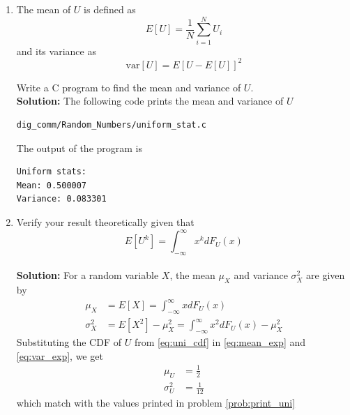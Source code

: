\documentclass[journal,10pt,twocolumn]{IEEEtran}
\providecommand{\sbrak}[1]{\ensuremath{{}\left[#1\right]}}
\newcommand{\solution}{\noindent \textbf{Solution: }}
\begin{document}
\begin{enumerate}
\item
\label{prob:print_uni}
The mean of $U$ is defined as
%
\begin{equation}
E\sbrak{U} = \frac{1}{N}\sum_{i=1}^{N}U_i
\end{equation}
%
and its variance as
%
\begin{equation}
\text{var}\sbrak{U} = E\sbrak{U- E\sbrak{U}}^2 
\end{equation}

Write a C program to  find the mean and variance of $U$.\\
\solution The following code prints the mean and variance of $U$
\begin{lstlisting}
dig_comm/Random_Numbers/uniform_stat.c
\end{lstlisting}
The output of the program is
\begin{lstlisting}
Uniform stats:
Mean: 0.500007
Variance: 0.083301
\end{lstlisting}

\item Verify your result theoretically given that
%
\begin{equation}
E\sbrak{U^k} = \int_{-\infty}^{\infty}x^kdF_{U}(x)
\end{equation}\\
\solution For a random variable $X$, the mean $\mu_X$ and variance $\sigma_X^2$ are given by
\begin{align}
	\label{eq:mean_exp}
	\mu_X &= E\sbrak{X} = \int_{-\infty}^{\infty}xdF_{U}(x) \\
	\label{eq:var_exp}
	\sigma_X^2 &= E\sbrak{X^2} - \mu_X^2 = \int_{-\infty}^{\infty}x^2dF_{U}(x) - \mu_X^2
\end{align}  
Substituting the CDF of $U$ from \eqref{eq:uni_cdf} in \eqref{eq:mean_exp} and \eqref{eq:var_exp}, we get
\begin{align}
	\label{eq:mean_uni}
	\mu_U &= \frac{1}{2} \\
	\label{eq:var_uni}
	\sigma_U^2 &= \frac{1}{12}
\end{align}  
which match with the values printed in problem \ref{prob:print_uni}
\end{enumerate}
\end{document}
